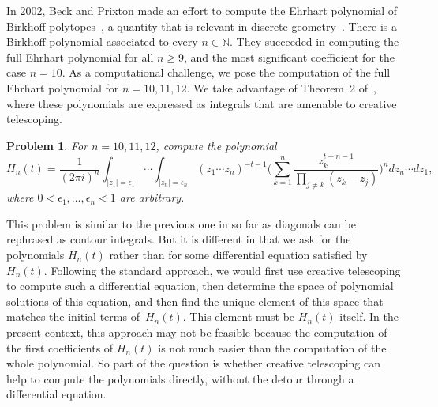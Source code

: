 \documentclass[a4paper,draft]{amsart}
\let\set\mathbb
\newtheorem{problem}{Problem}
\begin{document}
 In 2002, Beck and Prixton made an effort to compute the Ehrhart polynomial of Birkhoff polytopes~\cite{beck03}, a
 quantity that is relevant in discrete geometry~\cite{beck07}. There is a Birkhoff polynomial associated to every
 $n\in\set N$. They succeeded in computing the full Ehrhart polynomial for all $n\geq9$, and the most significant
 coefficient for the case $n=10$. As a computational challenge, we pose the computation of the
 full Ehrhart polynomial for $n=10,11,12$. We take advantage of Theorem~2 of~\cite{beck03}, where these polynomials
 are expressed as integrals that are amenable to creative telescoping.
 \begin{problem}
   For $n=10,11,12$, compute the polynomial
   \[
   H_n(t)=\frac1{(2\pi i)^n}\int_{|z_1|=\epsilon_1}\cdots\int_{|z_n|=\epsilon_n} (z_1\cdots z_n)^{-t-1}
      \biggl(\sum_{k=1}^n\frac{z_k^{t+n-1}}{\prod_{j\neq k}(z_k-z_j)}\biggr)^n dz_n\cdots dz_1,
   \]
   where $0<\epsilon_1,\dots,\epsilon_n<1$ are arbitrary.
 \end{problem}
 This problem is similar to the previous one in so far as diagonals can be rephrased as contour integrals. But it
 is different in that we ask for the polynomials $H_n(t)$ rather than for some differential equation
 satisfied by~$H_n(t)$. Following the standard approach, we would first use creative telescoping to compute such
 a differential equation, then determine the space of polynomial solutions of this equation, and then find
 the unique element of this space that matches the initial terms of~$H_n(t)$. This element must be $H_n(t)$ itself.
 In the present context, this approach may not be feasible because the computation of the first coefficients of $H_n(t)$
 is not much easier than the computation of the whole polynomial. So part of the question is whether creative telescoping
 can help to compute the polynomials directly, without the detour through a differential equation.

 
 
\end{document}
